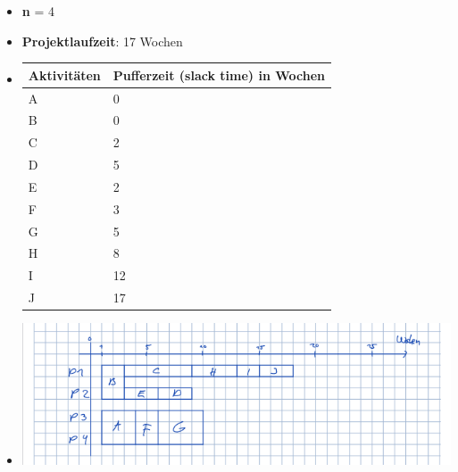 \begin{enumerate}[(a)]
        \begin{itemize}
            \item \textbf{n} = 4
            \item \textbf{Projektlaufzeit}: 17 Wochen
            \item[] \begin{tabular}{|l|l|}
                \hline
                \textbf{Aktivitäten} &  \textbf{Pufferzeit (slack time)} in Wochen\\ \hline  
                A & 0 \\ \hline 
                B & 0 \\ \hline 
                C & 2 \\ \hline 
                D & 5 \\ \hline 
                E & 2 \\ \hline 
                F & 3 \\ \hline 
                G & 5 \\ \hline 
                H & 8 \\ \hline 
                I & 12 \\ \hline 
                J & 17 \\ \hline 
            \end{tabular}
            
            \item[] \includegraphics[width=1\textwidth]{src/u12/task3/f_2.png} 
        \end{itemize}
    

\end{enumerate}
